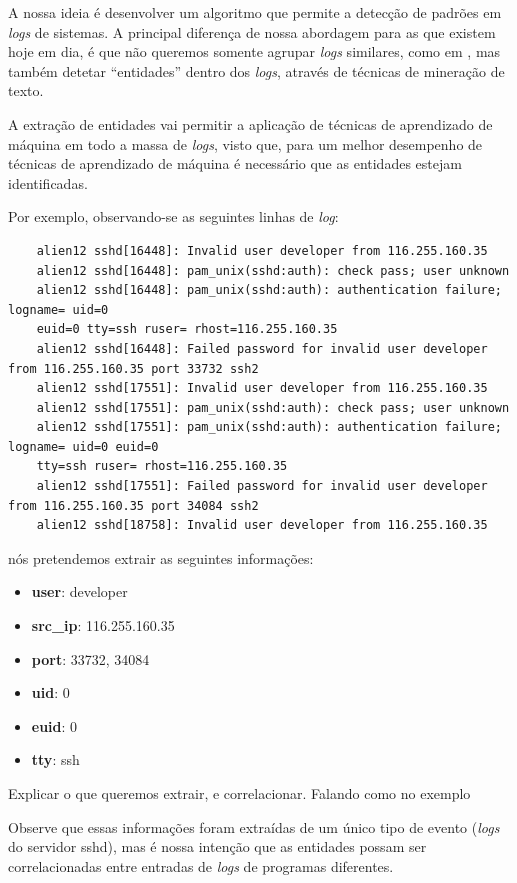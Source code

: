 \documentclass[
	12pt,				%
	openright,			%
	twoside,			%
	a4paper,			%
	english,			%
	french,				%
	spanish,			%
	brazil,				%
	]{abntex2}
\begin{document}
A nossa ideia é desenvolver um algoritmo que permite a detecção de padrões em \emph{logs} de sistemas. A principal diferença de nossa abordagem para as que existem hoje em dia, é que não queremos somente agrupar \emph{logs} similares, como em \cite{vaarandi2003data}, mas também detetar ``entidades'' dentro dos \emph{logs}, através de técnicas de mineração de texto.

A extração de entidades vai permitir a aplicação de técnicas de aprendizado de máquina em todo a massa de \emph{logs}, visto que, para um melhor desempenho de técnicas de aprendizado de máquina é necessário que as entidades estejam identificadas.

Por exemplo, observando-se as seguintes linhas de \emph{log}:

{\tiny
	\begin{verbatim}
	alien12 sshd[16448]: Invalid user developer from 116.255.160.35
	alien12 sshd[16448]: pam_unix(sshd:auth): check pass; user unknown
	alien12 sshd[16448]: pam_unix(sshd:auth): authentication failure; logname= uid=0 
	euid=0 tty=ssh ruser= rhost=116.255.160.35 
	alien12 sshd[16448]: Failed password for invalid user developer from 116.255.160.35 port 33732 ssh2
	alien12 sshd[17551]: Invalid user developer from 116.255.160.35
	alien12 sshd[17551]: pam_unix(sshd:auth): check pass; user unknown
	alien12 sshd[17551]: pam_unix(sshd:auth): authentication failure; logname= uid=0 euid=0 
	tty=ssh ruser= rhost=116.255.160.35 
	alien12 sshd[17551]: Failed password for invalid user developer from 116.255.160.35 port 34084 ssh2
	alien12 sshd[18758]: Invalid user developer from 116.255.160.35
	\end{verbatim}
}

nós pretendemos extrair as seguintes informações:

\begin{itemize}
	\item \textbf{user}: developer	
	\item \textbf{src\_ip}: 116.255.160.35	
	\item \textbf{port}: 33732, 34084	
	\item \textbf{uid}: 0	
	\item \textbf{euid}: 0	
	\item \textbf{tty}: ssh 
\end{itemize}

Explicar o que queremos extrair, e correlacionar. Falando como no exemplo

Observe que essas informações foram extraídas de um único tipo de evento (\emph{logs} do servidor sshd), mas é nossa intenção que as entidades possam ser correlacionadas entre entradas de \emph{logs} de programas diferentes.
\end{document}
